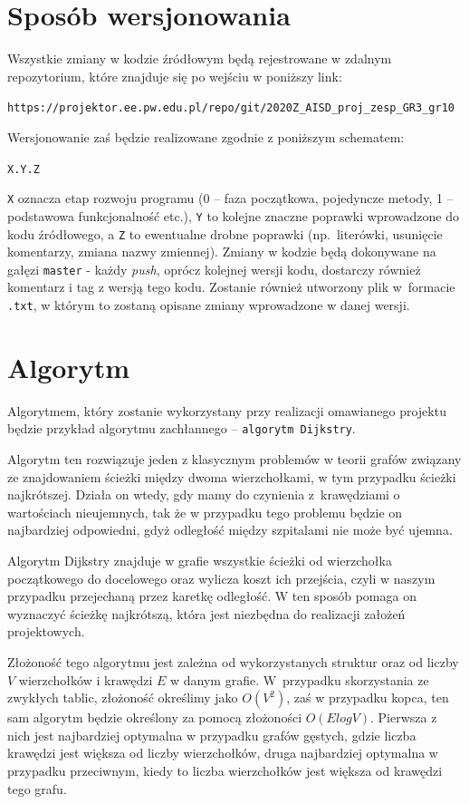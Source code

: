 \documentclass[12pt,a4paper]{article}
\begin{document}
\section{Sposób wersjonowania} %
Wszystkie zmiany w kodzie źródłowym będą rejestrowane w zdalnym repozytorium, które znajduje się po wejściu w poniższy link:\begin{center}
\small{\texttt{https://projektor.ee.pw.edu.pl/repo/git/2020Z\_AISD\_proj\_zesp\_GR3\_gr10}}
\end{center}
Wersjonowanie zaś będzie realizowane zgodnie z poniższym schematem:
\begin{center}
\texttt{X.Y.Z}
\end{center}
\texttt{X} oznacza etap rozwoju programu (0 – faza początkowa, pojedyncze metody, 1 – podstawowa funkcjonalność etc.), \texttt{Y} to kolejne znaczne poprawki wprowadzone do kodu źródłowego, a \texttt{Z} to ewentualne drobne poprawki (np.~literówki, usunięcie komentarzy, zmiana nazwy zmiennej).
Zmiany w kodzie będą dokonywane na gałęzi \texttt{master} - każdy \textit{push}, oprócz kolejnej wersji kodu, dostarczy również komentarz i tag z wersją tego kodu. Zostanie również utworzony plik w~formacie \texttt{.txt}, w którym to zostaną opisane zmiany wprowadzone w danej wersji.


\section{Algorytm} %

Algorytmem, który zostanie wykorzystany przy realizacji omawianego projektu będzie przykład algorytmu zachłannego – \texttt{algorytm Dijkstry}.

Algorytm ten rozwiązuje jeden z klasycznym problemów w teorii grafów związany ze znajdowaniem ścieżki między dwoma wierzchołkami, w tym przypadku ścieżki najkrótszej. Działa on wtedy, gdy mamy do czynienia z~krawędziami o wartościach nieujemnych, tak że w przypadku tego problemu będzie on najbardziej odpowiedni, gdyż odległość między szpitalami nie może być ujemna.

Algorytm Dijkstry znajduje w grafie wszystkie ścieżki od wierzchołka początkowego do docelowego oraz wylicza koszt ich przejścia, czyli w naszym przypadku przejechaną przez karetkę odległość. W ten sposób pomaga on wyznaczyć ścieżkę najkrótszą, która jest niezbędna do realizacji założeń projektowych.

Złożoność tego algorytmu jest zależna od wykorzystanych struktur oraz od liczby \texttt{$V$} wierzchołków i krawędzi \texttt{$E$} w danym grafie. W~przypadku skorzystania ze zwykłych tablic, złożoność określimy jako \texttt{$O(V^{2})$}, zaś w przypadku kopca, ten sam algorytm będzie określony za pomocą złożoności \texttt{$O(ElogV)$}. Pierwsza z nich jest najbardziej optymalna w przypadku grafów gęstych, gdzie liczba krawędzi jest większa od liczby wierzchołków, druga najbardziej optymalna w przypadku przeciwnym, kiedy to liczba wierzchołków jest większa od krawędzi tego grafu.
\newpage
\end{document}
